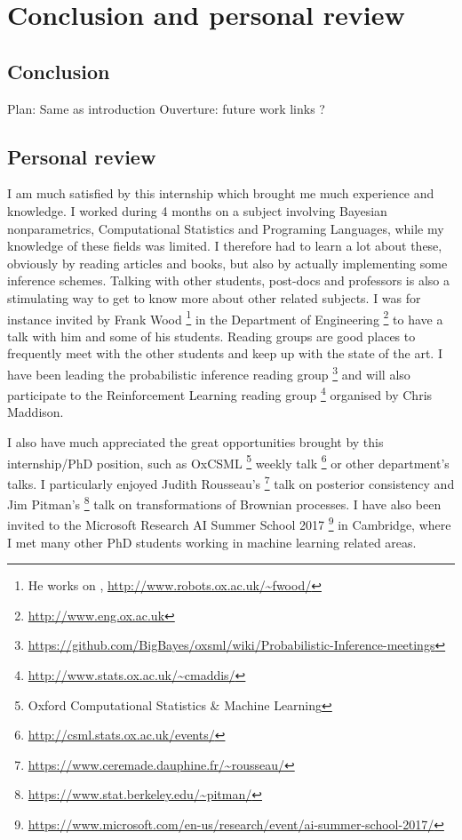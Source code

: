 
\chapter{Conclusion and personal review}

\section{Conclusion}
Plan: Same as introduction
Ouverture: future work links ?

\section{Personal review}
I am much satisfied by this internship which brought me much experience and knowledge.
I worked during 4 months on a subject involving Bayesian nonparametrics, Computational Statistics and Programing Languages, while my knowledge of these fields was limited. I therefore had to learn a lot about these, obviously by reading articles and books, but also by actually implementing some inference schemes. Talking with other students, post-docs and professors is also a stimulating way to get to know more about other related subjects. I was for instance invited by Frank Wood \footnote{He works on , \url{http://www.robots.ox.ac.uk/~fwood/}} in the Department of Engineering \footnote{\url{http://www.eng.ox.ac.uk}} to have a talk with him and some of his students. Reading groups are good places to frequently meet with the other students and keep up with the state of the art. I have been leading the probabilistic inference reading group \footnote{\url{https://github.com/BigBayes/oxsml/wiki/Probabilistic-Inference-meetings}} and will also participate to the Reinforcement Learning reading group \footnote{\url{http://www.stats.ox.ac.uk/~cmaddis/}} organised by Chris Maddison.

I also have much appreciated the great opportunities brought by this internship/PhD position, such as OxCSML \footnote{Oxford Computational Statistics \& Machine Learning} weekly talk \footnote{\url{http://csml.stats.ox.ac.uk/events/}} or other department's talks. I particularly enjoyed Judith Rousseau's \footnote{\url{https://www.ceremade.dauphine.fr/~rousseau/}} talk on posterior consistency and Jim Pitman's \footnote{\url{https://www.stat.berkeley.edu/~pitman/}} talk on transformations of Brownian processes. I have also been invited to the Microsoft Research AI Summer School 2017 \footnote{\url{https://www.microsoft.com/en-us/research/event/ai-summer-school-2017/}} in Cambridge, where I met many other PhD students working in machine learning related areas.

